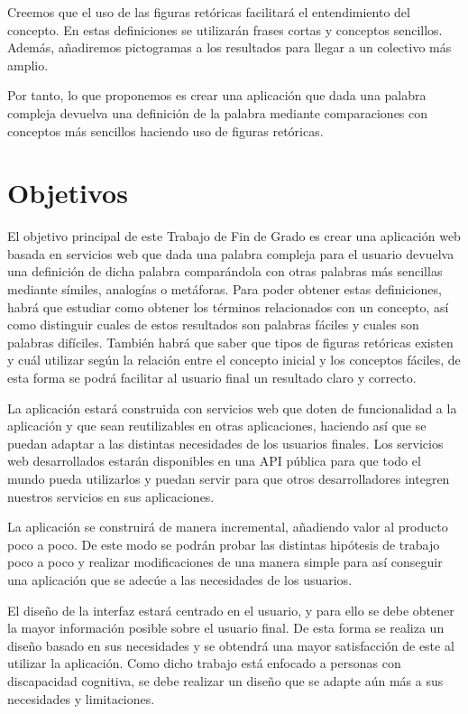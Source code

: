 Creemos que el uso de las figuras retóricas facilitará el entendimiento del concepto. En estas definiciones se utilizarán frases cortas y conceptos sencillos. 
Además, añadiremos pictogramas a los resultados para llegar a un colectivo más amplio.

Por tanto, lo que proponemos es crear una aplicación que dada una palabra compleja devuelva una definición de la palabra mediante comparaciones con conceptos más sencillos haciendo uso de figuras retóricas.

\section{Objetivos}
\label{cap:sec:objetivos}

El objetivo principal de este Trabajo de Fin de Grado es crear una aplicación web basada en servicios web que dada una palabra compleja para el usuario devuelva una definición de dicha palabra comparándola con otras palabras más sencillas mediante símiles, analogías o metáforas. 
Para poder obtener estas definiciones, habrá que estudiar como obtener los términos relacionados con un concepto, así como distinguir cuales de estos resultados son palabras fáciles y cuales son palabras difíciles. 
También habrá que saber que tipos de figuras retóricas existen y cuál utilizar según la relación entre el concepto inicial y los conceptos fáciles, de esta forma se podrá facilitar al usuario final un resultado claro y correcto.

La aplicación estará construida con servicios web que doten de funcionalidad a la aplicación y que sean reutilizables en otras aplicaciones, haciendo así que se puedan adaptar a las distintas necesidades de los usuarios finales.
Los servicios web desarrollados estarán disponibles en una API pública para que todo el mundo pueda utilizarlos y puedan servir para que otros desarrolladores integren nuestros servicios en sus aplicaciones.

La aplicación se construirá de manera incremental, añadiendo valor al producto poco a poco. De este modo se podrán probar las distintas hipótesis de trabajo poco a poco y realizar modificaciones de una manera simple para así conseguir una aplicación que se adecúe a las necesidades de los usuarios.

El diseño de la interfaz estará centrado en el usuario, y para ello se debe obtener la mayor información posible sobre el usuario final. De esta forma se realiza un diseño basado en sus necesidades y se obtendrá una mayor satisfacción de este al utilizar la aplicación.
Como dicho trabajo está enfocado a personas con discapacidad cognitiva, se debe realizar un diseño que se adapte aún más a sus necesidades y limitaciones.

